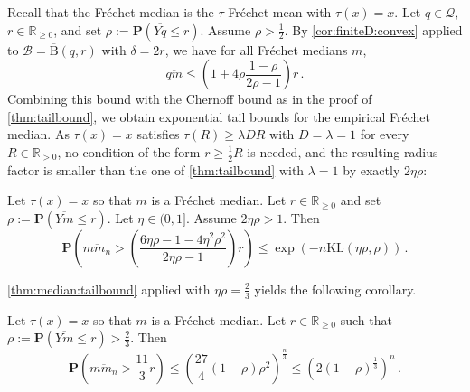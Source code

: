 \documentclass{article}
\newcommand*{\mc}[1]{\mathcal{#1}}
\newcommand{\R}{\mathbb{R}}
\newcommand{\Rp}{\R_{\geq0}}
\newcommand{\Rpp}{\R_{>0}}
\newcommand{\ball}{\mathrm{B}}
\newcommand{\lb}{\left(} %
\newcommand{\rb}{\right)} %
\newcommand{\br}[1]{\lb #1 \rb} %
\newcommand{\brOf}[1]{\!\br{#1}} %
\renewcommand{\Pr}{\mathbf{P}} %
\newcommand{\Prof}[1]{\Pr(#1)}
\newcommand{\PrOf}[1]{\Pr\brOf{#1}}
\newcommand{\eqfs}{\,.}
\newcommand{\kullback}{\mathrm{K\!L}} %
\newcommand{\ol}[2]{\overline{#1#2}}
\newcommand{\tran}{\tau}
\newcommand{\ballclosed}{\overline{\ball}}
\begin{document}
%
Recall that the Fr\'echet median is the $\tran$-Fr\'echet mean with $\tran(x) = x$.
Let $q\in\mc Q$, $r\in \Rp$, and set $\rho := \Prof{\ol Yq \leq r}$. Assume  $\rho > \frac{1}{2}$.
By \cref{cor:finiteD:convex} applied to $\mc B = \ballclosed(q, r)$ with $\delta = 2r$, we have for all Fr\'echet medians $m$,
\begin{equation}
    \ol qm \leq \br{1 + 4 \rho\frac{1 - \rho}{2\rho - 1}} r
    \eqfs
\end{equation}
%
Combining this bound with the Chernoff bound as in the proof of \cref{thm:tailbound}, we obtain exponential tail bounds for the empirical Fr\'echet median. As $\tran(x) = x$ satisfies $\tran(R) \geq \lambda D R$ with $D = \lambda = 1$ for every $R\in\Rpp$, no condition of the form $r \geq \frac12 R$ is needed, and the resulting radius factor is smaller than the one of \cref{thm:tailbound} with $\lambda = 1$ by exactly $2\eta\rho$:
%
\begin{theorem}\label{thm:median:tailbound}
    Let $\tran(x)=x$ so that $m$ is a Fr\'echet median. 
    Let $r \in \Rp$ and set $\rho := \Prof{\ol Ym \leq r}$.
    Let $\eta \in (0,1]$.
    Assume $2\eta\rho > 1$.
    Then
    \begin{equation}
        \PrOf{\ol m{m_n} > \br{\frac{6\eta\rho - 1 - 4\eta^2\rho^2}{2\eta\rho - 1}} r}
        \leq
        \exp\brOf{-n \kullback(\eta\rho, \rho)}
        \eqfs
    \end{equation}
\end{theorem}
%
\cref{thm:median:tailbound} applied with $\eta\rho = \frac23$ yields the following corollary.
%
\begin{corollary}\label{cor:median:tailbound}
    Let $\tran(x)=x$ so that $m$ is a Fr\'echet median. 
    Let $r \in \Rp$ such that $\rho := \Prof{\ol Ym \leq r} > \frac23$.
    Then
    \begin{equation}
        \PrOf{\ol m{m_n} > \frac{11}3 r}
        \leq
        \br{\frac{27}{4} (1-\rho) \rho^2}^{\frac n3}
        \leq
        \br{2 (1-\rho)^{\frac13}}^{n}
        \eqfs
    \end{equation}
\end{corollary}
%
%
%
%
%
\end{document}
